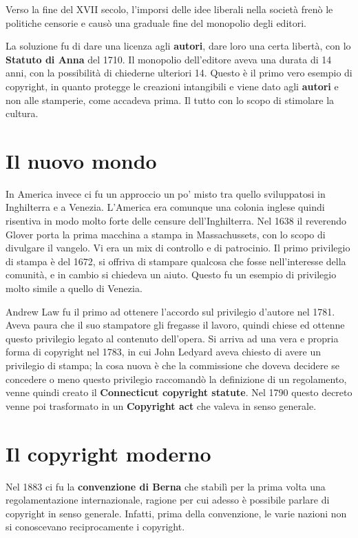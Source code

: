 Verso la fine del XVII secolo, l'imporsi delle idee liberali nella società frenò le politiche censorie e causò una graduale fine del monopolio degli editori.

La soluzione fu di dare una licenza agli \textbf{autori}, dare loro una certa libertà, con lo \textbf{Statuto di Anna} del 1710. 
Il monopolio dell'editore aveva una durata di 14 anni, con la possibilità di chiederne ulteriori 14. Questo è il primo vero esempio di copyright, in quanto protegge le creazioni intangibili e viene dato agli \textbf{autori} e non alle stamperie, come accadeva prima. Il tutto con lo scopo di stimolare la cultura.

\section{Il nuovo mondo}

In America invece ci fu un approccio un po' misto tra quello sviluppatosi in Inghilterra e a Venezia. L'America era comunque una colonia inglese quindi risentiva in modo molto forte delle censure dell'Inghilterra. Nel 1638 il reverendo Glover porta la prima macchina a stampa in Massachussets, con lo scopo di divulgare il vangelo. Vi era un mix di controllo e di patrocinio.  Il primo privilegio di stampa è del 1672, si offriva di stampare qualcosa che fosse nell'interesse della comunità, e in cambio si chiedeva un aiuto. Questo fu un esempio di privilegio molto simile a quello di Venezia. 

Andrew Law fu il primo ad ottenere l'accordo sul privilegio d'autore nel 1781. Aveva paura che il suo stampatore gli fregasse il lavoro, quindi chiese ed ottenne questo privilegio legato al contenuto dell'opera. Si arriva ad una vera e propria forma di copyright nel 1783, in cui John Ledyard aveva chiesto di avere un privilegio di stampa; la cosa nuova è che la commissione che doveva decidere se concedere o meno questo privilegio raccomandò la definizione di un regolamento, venne quindi creato il \textbf{Connecticut copyright statute}. Nel 1790 questo decreto venne poi trasformato in un \textbf{Copyright act} che valeva in senso generale.

\section{Il copyright moderno}

Nel 1883 ci fu la \textbf{convenzione di Berna} che stabilì per la prima volta una regolamentazione internazionale, ragione per cui adesso è possibile parlare di copyright in senso generale. Infatti, prima della convenzione, le varie nazioni non si conoscevano reciprocamente i copyright. 

